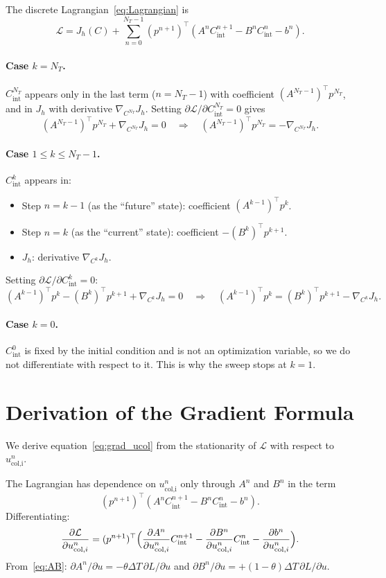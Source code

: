 \documentclass[11pt, a4paper]{article}
\newcommand{\dT}{\Delta T}
\newcommand{\pder}[2]{\frac{\partial #1}{\partial #2}}
\theoremstyle{definition}
\theoremstyle{plain}
\begin{document}
The discrete Lagrangian~\eqref{eq:Lagrangian} is
\[
  \mathcal{L} = J_h(C) + \sum_{n=0}^{N_T-1}
    (p^{n+1})^\top (A^n C_\text{int}^{n+1} - B^n C_\text{int}^n - b^n).
\]

\paragraph{Case $k = N_T$.}
$C_\text{int}^{N_T}$ appears only in the last term ($n = N_T - 1$) with
coefficient $(A^{N_T-1})^\top p^{N_T}$, and in $J_h$ with derivative
$\nabla_{C^{N_T}} J_h$. Setting
$\partial \mathcal{L} / \partial C_\text{int}^{N_T} = 0$ gives
\[
  (A^{N_T-1})^\top p^{N_T} + \nabla_{C^{N_T}} J_h = 0
  \quad\Rightarrow\quad
  (A^{N_T-1})^\top p^{N_T} = -\nabla_{C^{N_T}} J_h.
\]

\paragraph{Case $1 \leq k \leq N_T - 1$.}
$C_\text{int}^k$ appears in:
\begin{itemize}
  \item Step $n = k-1$ (as the ``future'' state): coefficient
    $(A^{k-1})^\top p^k$.
  \item Step $n = k$ (as the ``current'' state): coefficient
    $-(B^k)^\top p^{k+1}$.
  \item $J_h$: derivative $\nabla_{C^k} J_h$.
\end{itemize}
Setting $\partial \mathcal{L} / \partial C_\text{int}^k = 0$:
\[
  (A^{k-1})^\top p^k - (B^k)^\top p^{k+1} + \nabla_{C^k} J_h = 0
  \quad\Rightarrow\quad
  (A^{k-1})^\top p^k = (B^k)^\top p^{k+1} - \nabla_{C^k} J_h.
\]

\paragraph{Case $k = 0$.}
$C_\text{int}^0$ is fixed by the initial condition and is not an
optimization variable, so we do not differentiate with respect to it.
This is why the sweep stops at $k = 1$.

\section{Derivation of the Gradient Formula}
\label{app:gradient_derivation}

We derive equation~\eqref{eq:grad_ucol} from the stationarity of
$\mathcal{L}$ with respect to $u_\text{col,i}^n$.

The Lagrangian has dependence on $u_\text{col,i}^n$ only through
$A^n$ and $B^n$ in the term
\[
  (p^{n+1})^\top (A^n C_\text{int}^{n+1} - B^n C_\text{int}^n - b^n).
\]
Differentiating:
\[
  \pder{\mathcal{L}}{u_{\text{col},i}^n}
  = (p^{n+1})^\top
    \Bigl(
      \pder{A^n}{u_{\text{col},i}^n} C_\text{int}^{n+1}
      - \pder{B^n}{u_{\text{col},i}^n} C_\text{int}^n
      - \pder{b^n}{u_{\text{col},i}^n}
    \Bigr).
\]
From~\eqref{eq:AB}:
$\partial A^n/\partial u = -\theta\dT\,\partial L/\partial u$ and
$\partial B^n/\partial u = +(1-\theta)\dT\,\partial L/\partial u$.
\end{document}
